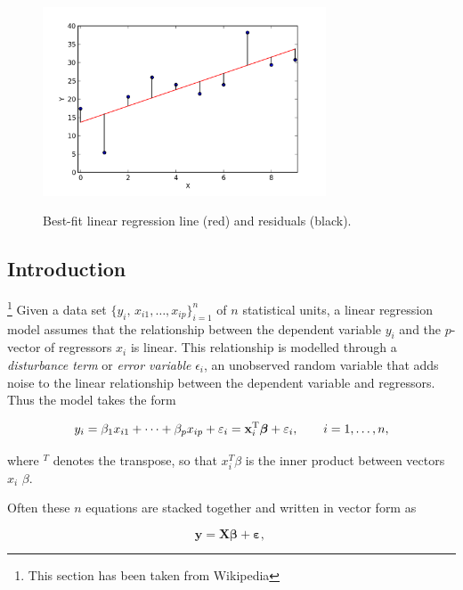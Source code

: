 \begin{figure}
  \centering
  \includegraphics[width=0.75\textwidth]{../Images/residuals_linreg.png}\\
  \caption{Best-fit linear regression line (red) and residuals (black). }\label{fig:residuals}
\end{figure}


\subsection{Introduction}

\footnote{This section has been taken from Wikipedia} Given a data set $\{y_i,\, x_{i1}, \ldots, x_{ip}\}_{i=1}^n$ of $n$ statistical units, a linear regression model assumes that the relationship between the dependent variable $y_i$ and the $p$-vector of regressors $x_i$ is linear. This relationship is modelled through a \emph{disturbance term} or \emph{error variable} $\epsilon_i$, an unobserved random variable that adds noise to the linear relationship between the dependent variable and regressors. Thus the model takes the form

\begin{equation}\label{eq:regression}
   y_i = \beta_1   x_{i1} + \cdots + \beta_p x_{ip} + \varepsilon_i
   = \mathbf{x}^{\rm T}_i\boldsymbol\beta + \varepsilon_i,
   \qquad i = 1, \ldots, n,
\end{equation}

where $^T$ denotes the transpose, so that $x_i^T\beta$ is the inner product between vectors $x_i$ $\beta$.

Often these $n$ equations are stacked together and written in vector form as

\begin{equation}
  \mathbf{y} = \mathbf{X}\boldsymbol\beta + \boldsymbol\varepsilon, \,
\end{equation}

